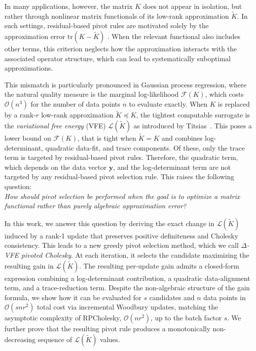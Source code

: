 \documentclass[onefignum,onetabnum]{siamart250211}
\newcommand{\tr}{\mathrm{tr}}
\begin{document}
In many applications, however, the matrix $K$ does not appear in isolation, but rather through nonlinear matrix functionals of its low-rank approximation $\widetilde{K}$. In such settings, residual-based pivot rules are motivated solely by the approximation error $\tr(K - \widetilde{K})$ \cite{gittens.2013}. When the relevant functional also includes other terms, this criterion neglects how the approximation interacts with the associated operator structure, which can lead to systematically suboptimal approximations.

This mismatch is particularly pronounced in Gaussian process regression, where the natural quality measure is the marginal log-likelihood $\mathcal{F}(K)$, which costs $\mathcal{O}(n^3)$ for the number of data points $n$ to evaluate exactly. When $K$ is replaced by a rank-$r$ low-rank approximation $\widetilde{K} \preceq K$, the tightest computable surrogate is the \textit{variational free energy} (VFE) $\mathcal{L}(\widetilde{K})$ as introduced by Titsias~\cite{Titsias.2009}. This poses a lower bound on $\mathcal{F}(K)$, that is tight when $\widetilde{K} = K$ and combines log-determinant, quadratic data-fit, and trace components. Of these, only the trace term is targeted by residual-based pivot rules. 
Therefore, the quadratic term, which depends on the data vector $\bm{y}$, and the log-determinant term are not targeted by any residual-based pivot selection rule. 
This raises the following question: \\ \textit{How should pivot selection be performed when the goal is to optimize a matrix functional rather than purely algebraic approximation error?}

In this work, we answer this question by deriving the exact change in $\mathcal{L}(\widetilde{K})$ induced by a rank-1 update that preserves positive definiteness and Cholesky consistency. This leads to a new greedy pivot selection method, which we call \textit{$\Delta$-VFE pivoted Cholesky}. At each iteration, it selects the candidate maximizing the resulting gain in $\mathcal{L}(\widetilde{K})$. The resulting per-update gain admits a closed-form expression combining a log-determinant contribution, a quadratic data-alignment term, and a trace-reduction term. Despite the non-algebraic structure of the gain formula, we show how it can be evaluated for $s$ candidates and $n$ data points in $\mathcal{O}(snr^2)$ total cost via incremental Woodbury updates, matching the asymptotic complexity of RPCholesky, $\mathcal{O}(nr^2)$, up to the batch factor $s$. We further prove that the resulting pivot rule produces a monotonically non-decreasing sequence of $\mathcal{L}(\widetilde{K})$ values.
\end{document}
